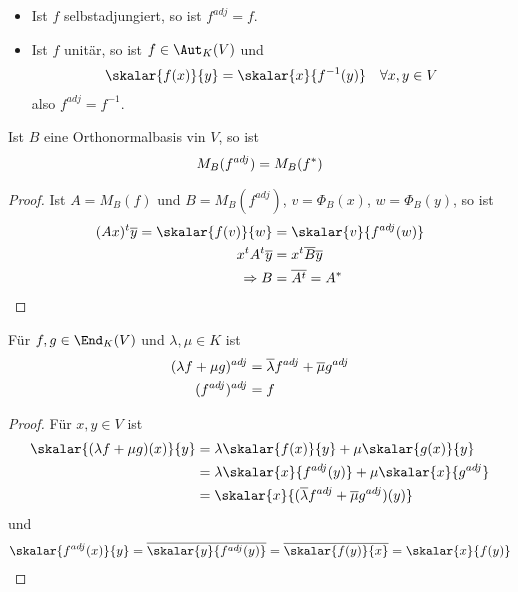 \begin{example}
	\begin{itemize}
		\item Ist $f$ selbstadjungiert, so ist $f^{adj}=f$.
		\item Ist $f$ unitär, so ist $f\in\Aut_K(V)$ und 
		\begin{align}
		\skalar{f(x)}{y}=\skalar{x}{f^{-1}(y)}\quad\forall x,y\in V\notag
		\end{align}
		also $f^{adj}=f^{-1}$.
	\end{itemize}
\end{example}

\begin{lemma}
	Ist $B$ eine Orthonormalbasis vin $V$, so ist
	\begin{align}
		M_B(f^{adj})=M_B(f^*)\notag
	\end{align}
\end{lemma}
\begin{proof}
	Ist $A=M_B(f)$ und $B=M_B(f^{adj})$, $v=\Phi_B(x)$, $w=\Phi_B(y)$, so ist
	\begin{align}
		(Ax)^t\overline{y}=\skalar{f(v)}{w}&=\skalar{v}{f^{adj}(w)}\notag \\
		x^tA^t\overline{y} &= x^t\overline{B}\overline{y} \notag \\
		\Rightarrow B&= \overline{A^t}=A^*\notag
	\end{align}
\end{proof}

\begin{lemma}
	Für $f,g\in\End_K(V)$ und $\lambda,\mu\in K$ ist
	\begin{align}
		(\lambda f+\mu g)^{adj} &= \overline{\lambda}f^{adj}+\overline{\mu}g^{adj}\notag \\
		(f^{adj})^{adj} &= f\notag
	\end{align}
\end{lemma}
\begin{proof}
	Für $x,y\in V$ ist
	\begin{align}
		\skalar{(\lambda f+\mu g)(x)}{y}&=\lambda\skalar{f(x)}{y}+\mu\skalar{g(x)}{y}\notag \\
		&= \lambda\skalar{x}{f^{adj}(y)}+\mu\skalar{x}{g^{adj}} \notag \\
		&= \skalar{x}{(\overline{\lambda}f^{adj}+\overline{\mu}g^{adj})(y)}\notag
	\end{align}
	und
	\begin{align}
		\skalar{f^{adj}(x)}{y}=\overline{\skalar{y}{f^{adj}(y)}}=\overline{\skalar{f(y)}{x}}=\skalar{x}{f(y)}\notag
	\end{align}
\end{proof}